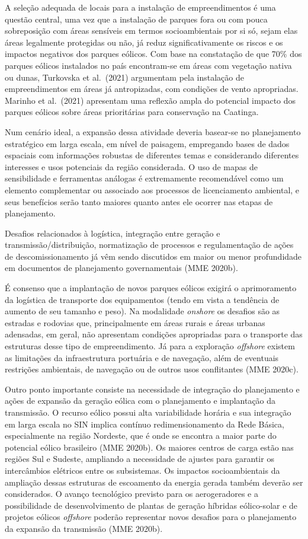 \documentclass[
  oneside]{scrbook}
\begin{document}
A seleção adequada de locais para a instalação de empreendimentos é uma questão central, uma vez que a instalação de parques fora ou com pouca sobreposição com áreas sensíveis em termos socioambientais por si só, sejam elas áreas legalmente protegidas ou não, já reduz significativamente os riscos e os impactos negativos dos parques eólicos. Com base na constatação de que 70\% dos parques eólicos instalados no país encontram-se em áreas com vegetação nativa ou dunas, Turkovska et al.~(2021) argumentam pela instalação de empreendimentos em áreas já antropizadas, com condições de vento apropriadas. Marinho et al.~(2021) apresentam uma reflexão ampla do potencial impacto dos parques eólicos sobre áreas prioritárias para conservação na Caatinga.

Num cenário ideal, a expansão dessa atividade deveria basear-se no planejamento estratégico em larga escala, em nível de paisagem, empregando bases de dados espaciais com informações robustas de diferentes temas e considerando diferentes interesses e usos potenciais da região considerada. O uso de mapas de sensibilidade e ferramentas análogas é extremamente recomendável como um elemento complementar ou associado aos processos de licenciamento ambiental, e seus benefícios serão tanto maiores quanto antes ele ocorrer nas etapas de planejamento.

Desafios relacionados à logística, integração entre geração e transmissão/distribuição, normatização de processos e regulamentação de ações de descomissionamento já vêm sendo discutidos em maior ou menor profundidade em documentos de planejamento governamentais (MME 2020b).

É consenso que a implantação de novos parques eólicos exigirá o aprimoramento da logística de transporte dos equipamentos (tendo em vista a tendência de aumento de seu tamanho e peso). Na modalidade \emph{onshore} os desafios são as estradas e rodovias que, principalmente em áreas rurais e áreas urbanas adensadas, em geral, não apresentam condições apropriadas para o transporte das estruturas desse tipo de empreendimento. Já para a exploração \emph{offshore} existem as limitações da infraestrutura portuária e de navegação, além de eventuais restrições ambientais, de navegação ou de outros usos conflitantes (MME 2020c).

Outro ponto importante consiste na necessidade de integração do planejamento e ações de expansão da geração eólica com o planejamento e implantação da transmissão. O recurso eólico possui alta variabilidade horária e sua integração em larga escala no SIN implica contínuo redimensionamento da Rede Básica, especialmente na região Nordeste, que é onde se encontra a maior parte do potencial eólico brasileiro (MME 2020b). Os maiores centros de carga estão nas regiões Sul e Sudeste, ampliando a necessidade de ajustes para garantir os intercâmbios elétricos entre os subsistemas. Os impactos socioambientais da ampliação dessas estruturas de escoamento da energia gerada também deverão ser considerados. O avanço tecnológico previsto para os aerogeradores e a possibilidade de desenvolvimento de plantas de geração híbridas eólico-solar e de projetos eólicos \emph{offshore} poderão representar novos desafios para o planejamento da expansão da transmissão (MME 2020b).
\end{document}
